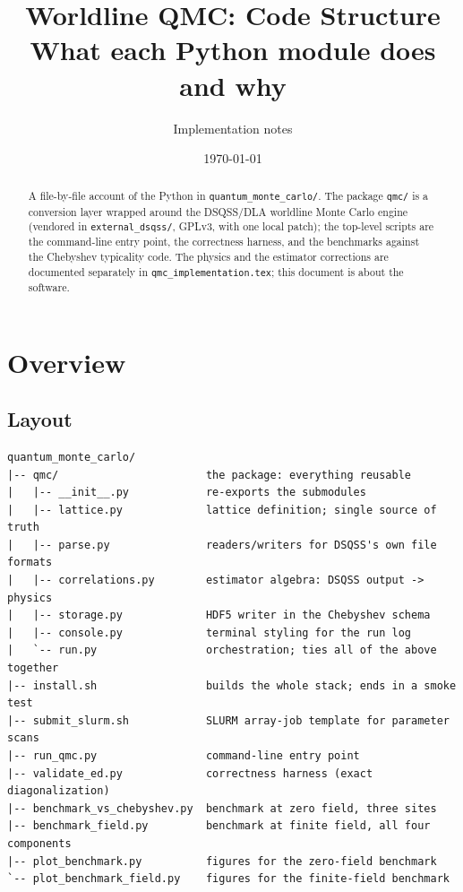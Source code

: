 \documentclass[11pt,a4paper]{article}
\title{\textbf{Worldline QMC: Code Structure}\\[0.3em]
       \large What each Python module does and why}
\author{Implementation notes}
\date{\today}
\newcommand{\code}[1]{\texttt{#1}}
\begin{document}
\maketitle

\begin{abstract}
A file-by-file account of the Python in \code{quantum\_monte\_carlo/}. The
package \code{qmc/} is a conversion layer wrapped around the DSQSS/DLA worldline
Monte Carlo engine (vendored in \code{external\_dsqss/}, GPLv3, with one local
patch); the top-level scripts are the command-line entry point, the correctness
harness, and the benchmarks against the Chebyshev typicality code. The physics
and the estimator corrections are documented separately in
\code{qmc\_implementation.tex}; this document is about the software.
\end{abstract}

\tableofcontents

\newpage

\section{Overview}

\subsection{Layout}

\begin{lstlisting}
quantum_monte_carlo/
|-- qmc/                       the package: everything reusable
|   |-- __init__.py            re-exports the submodules
|   |-- lattice.py             lattice definition; single source of truth
|   |-- parse.py               readers/writers for DSQSS's own file formats
|   |-- correlations.py        estimator algebra: DSQSS output -> physics
|   |-- storage.py             HDF5 writer in the Chebyshev schema
|   |-- console.py             terminal styling for the run log
|   `-- run.py                 orchestration; ties all of the above together
|-- install.sh                 builds the whole stack; ends in a smoke test
|-- submit_slurm.sh            SLURM array-job template for parameter scans
|-- run_qmc.py                 command-line entry point
|-- validate_ed.py             correctness harness (exact diagonalization)
|-- benchmark_vs_chebyshev.py  benchmark at zero field, three sites
|-- benchmark_field.py         benchmark at finite field, all four components
|-- plot_benchmark.py          figures for the zero-field benchmark
`-- plot_benchmark_field.py    figures for the finite-field benchmark
\end{lstlisting}
\end{document}
